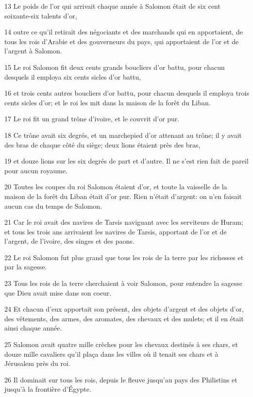 \par 13 Le poids de l'or qui arrivait chaque année à Salomon était de six cent soixante-six talents d'or,
\par 14 outre ce qu'il retirait des négociants et des marchands qui en apportaient, de tous les rois d'Arabie et des gouverneurs du pays, qui apportaient de l'or et de l'argent à Salomon.
\par 15 Le roi Salomon fit deux cents grands boucliers d'or battu, pour chacun desquels il employa six cents sicles d'or battu,
\par 16 et trois cents autres boucliers d'or battu, pour chacun desquels il employa trois cents sicles d'or; et le roi les mit dans la maison de la forêt du Liban.
\par 17 Le roi fit un grand trône d'ivoire, et le couvrit d'or pur.
\par 18 Ce trône avait six degrés, et un marchepied d'or attenant au trône; il y avait des bras de chaque côté du siège; deux lions étaient près des bras,
\par 19 et douze lions sur les six degrés de part et d'autre. Il ne s'est rien fait de pareil pour aucun royaume.
\par 20 Toutes les coupes du roi Salomon étaient d'or, et toute la vaisselle de la maison de la forêt du Liban était d'or pur. Rien n'était d'argent: on n'en faisait aucun cas du temps de Salomon.
\par 21 Car le roi avait des navires de Tarsis naviguant avec les serviteurs de Huram; et tous les trois ans arrivaient les navires de Tarsis, apportant de l'or et de l'argent, de l'ivoire, des singes et des paons.
\par 22 Le roi Salomon fut plus grand que tous les rois de la terre par les richesses et par la sagesse.
\par 23 Tous les rois de la terre cherchaient à voir Salomon, pour entendre la sagesse que Dieu avait mise dans son coeur.
\par 24 Et chacun d'eux apportait son présent, des objets d'argent et des objets d'or, des vêtements, des armes, des aromates, des chevaux et des mulets; et il en était ainsi chaque année.
\par 25 Salomon avait quatre mille crèches pour les chevaux destinés à ses chars, et douze mille cavaliers qu'il plaça dans les villes où il tenait ses chars et à Jérusalem près du roi.
\par 26 Il dominait sur tous les rois, depuis le fleuve jusqu'au pays des Philistins et jusqu'à la frontière d'Égypte.

